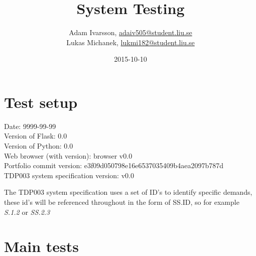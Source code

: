 \documentclass{TDP003mall}
\author{Adam Ivarsson, \url{adaiv505@student.liu.se}\\
  Lukas Michanek, \url{lukmi182@student.liu.se}}
\title{System Testing}
\date{2015-10-10}
\begin{document}
\projectpage

\section{Test setup}\label{test-setup}

Date: 9999-99-99\\
Version of Flask: 0.0\\
Version of Python: 0.0\\
Web browser (with version): browser v0.0\\
Portfolio commit version: e3f09d050798e16e6537035409b4aea2097b787d\\
TDP003 system specification version: v0.0


The TDP003 system specification uses a set of ID's to identify specific demands, these id's will be referenced throughout in the form of SS.ID, so for example \textit{S.1.2} or \textit{SS.2.3}


\section{Main tests}\label{main-tests}
\end{document}
